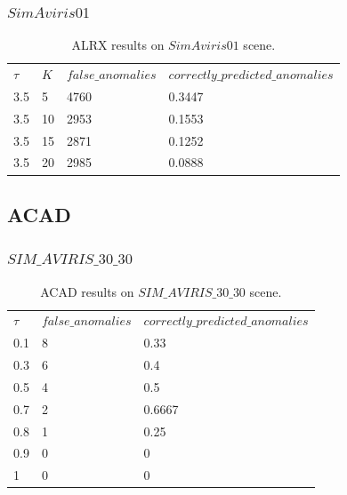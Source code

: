 \subsubsection{$SimAviris01$}

 \begin{table}[H]
\centering
 \resizebox{0.9\textwidth}{!}
{\begin{tabular}{l|l|l|l}
\textbf{$\tau$} &\textbf{$K$} & $false\_anomalies$ & $correctly\_predicted\_anomalies$\\
3.5&5 &4760 & 0.3447 \\
3.5&10 &2953 &0.1553 \\
3.5&15 &2871 &0.1252 \\
3.5&20 & 2985&0.0888 \\

\end{tabular}}
\caption{ALRX results on $SimAviris01$ scene.}
\label{tab:ALRX_simAviris01}
\end{table}


\subsection{ACAD}
\subsubsection{$SIM\_AVIRIS\_30\_30$}
 \begin{table}[H]
\centering
 \resizebox{0.9\textwidth}{!}
{\begin{tabular}{l|l|l}
\textbf{$\tau$}  & $false\_anomalies$ & $correctly\_predicted\_anomalies$\\
0.1& 8& 0.33 \\
0.3 &6 &0.4 \\
0.5& 4&0.5 \\
0.7& 2&0.6667 \\
0.8&1&0.25\\
0.9 &0 &0\\
1 & 0&0 \\

\end{tabular}}
\caption{ACAD results on $SIM\_AVIRIS\_30\_30$ scene.}
\label{tab:ACAD_simAviris30_30}
\end{table}

